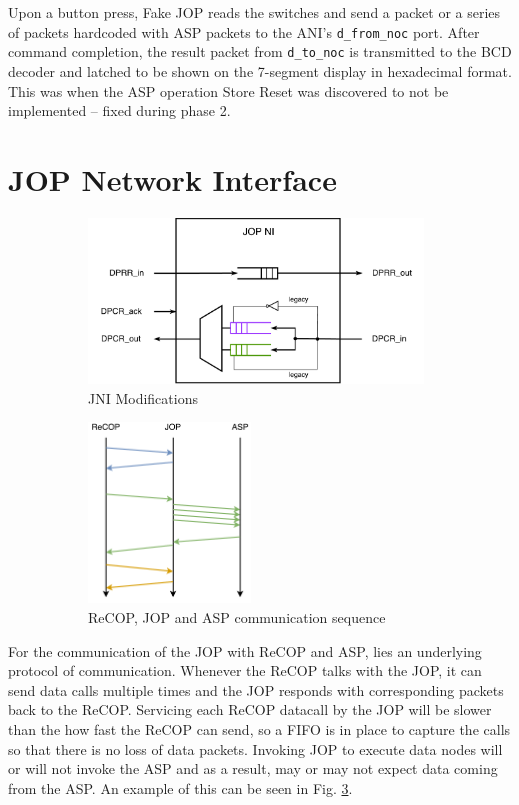 \documentclass[]{article}
\begin{document}
	Upon a button press, Fake JOP reads the switches and send a packet or a series of packets hardcoded with ASP packets to the ANI's \texttt{d\_from\_noc} port. After command completion, the result packet from \texttt{d\_to\_noc} is transmitted to the BCD decoder and latched to be shown on the 7-segment display in hexadecimal format. This was when the ASP operation Store Reset was discovered to not be implemented -- fixed during phase 2.
	
	\newpage
	
	\section{JOP Network Interface}
	
	\begin{figure}[H]
		\centering
		\captionsetup{justification=centering,margin=2cm}
		\begin{subfigure}[t]{.55\textwidth}
			\centering
			\includegraphics[width=3.5in]{jni_diagram}
			
			\caption{JNI Modifications}
			\label{fig:jni_diagram}
		\end{subfigure}%
		\begin{subfigure}[t]{.35\textwidth}
			\centering
			\includegraphics[width=1.7in]{rja_diagram}
			\caption{ReCOP, JOP and ASP communication sequence}
			\label{fig:rja_diagram}
		\end{subfigure}
		\caption{}
	\end{figure}
	
	
	For the communication of the JOP with ReCOP and ASP, lies an underlying protocol of communication. Whenever the ReCOP talks with the JOP, it can send data calls multiple times and the JOP responds with corresponding packets back to the ReCOP. Servicing each ReCOP datacall by the JOP will be slower than the how fast the ReCOP can send, so a FIFO is in place to capture the calls so that there is no loss of data packets. Invoking JOP to execute data nodes will or will not invoke the ASP and as a result, may or may not expect data coming from the ASP. An example of this can be seen in Fig. \ref{fig:rja_diagram}.
	\par
	
\end{document}
